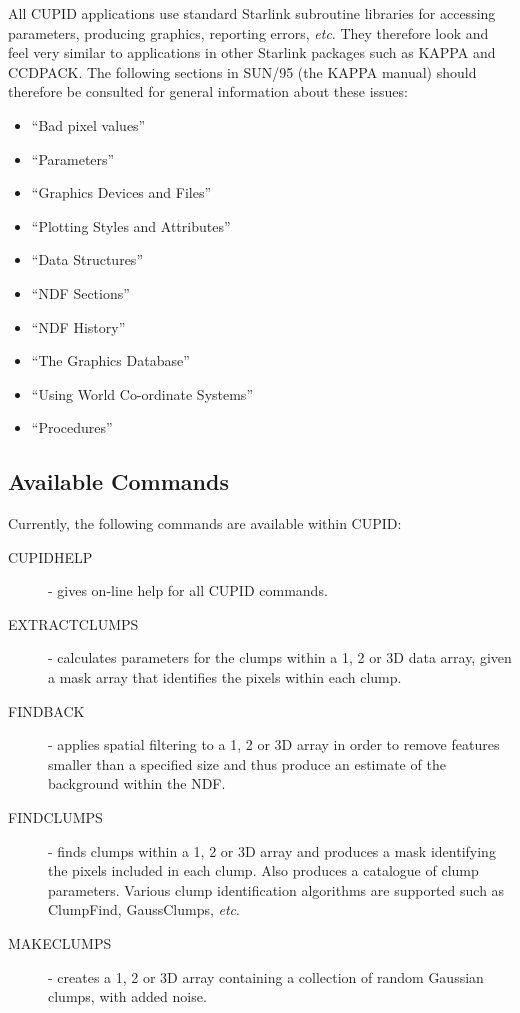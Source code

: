 \documentclass[twoside,11pt]{article}
\newcommand{\htmlref}[2]{#1}
\newcommand{\xref}[3]{#1}
\newcommand{\xlabel}[1]{}
\renewcommand{\_}{\texttt{\symbol{95}}}
\begin{document}
All CUPID applications use standard Starlink subroutine libraries for
accessing parameters, producing graphics, reporting errors, \emph{etc}. They
therefore look and feel very similar to applications in other Starlink
packages such as KAPPA and CCDPACK. The following sections in
\xref{SUN/95}{sun95}{} (the KAPPA manual) should therefore be consulted for 
general information about these issues:

\begin{itemize}
\item ``\xref{Bad pixel values}{sun95}{se_masking}''
\item ``\xref{Parameters}{sun95}{se_param}''
\item ``\xref{Graphics Devices and Files}{sun95}{se_graphdev}''
\item ``\xref{Plotting Styles and Attributes}{sun95}{se_style}''
\item ``\xref{Data Structures}{sun95}{se_datastr}''
\item ``\xref{NDF Sections}{sun95}{se_ndfsect}''
\item ``\xref{NDF History}{sun95}{se_ndfhistory}''
\item ``\xref{The Graphics Database}{sun95}{se_agitate}''
\item ``\xref{Using World Co-ordinate Systems}{sun95}{se_wcsuse}''
\item ``\xref{Procedures}{sun95}{se_procedures}''
\end{itemize}

\subsection{\xlabel{availablecommands}Available Commands}
Currently, the following commands are available within CUPID:
\begin{description}

\item[\htmlref{CUPIDHELP}{CUPIDHELP}] - gives on-line help for all CUPID
commands.

\item[\htmlref{EXTRACTCLUMPS}{EXTRACTCLUMPS}] - calculates parameters for
the clumps within a 1, 2 or 3D data array, given a mask array that identifies 
the pixels within each clump.
 
\item[\htmlref{FINDBACK}{FINDBACK}] - applies spatial filtering to a 1, 2 
or 3D array in order to remove features smaller than a specified size and
thus produce an estimate of the background within the NDF.

\item[\htmlref{FINDCLUMPS}{FINDCLUMPS}] - finds clumps within a 1, 2 or 3D 
array and produces a mask identifying the pixels included in each clump.
Also produces a catalogue of clump parameters. Various clump
identification algorithms are supported such as ClumpFind, GaussClumps,
\emph{etc}.

\item[\htmlref{MAKECLUMPS}{MAKECLUMPS}] - creates a 1, 2 or 3D array
containing a collection of random Gaussian clumps, with added noise.

\end{description}
\end{document}
